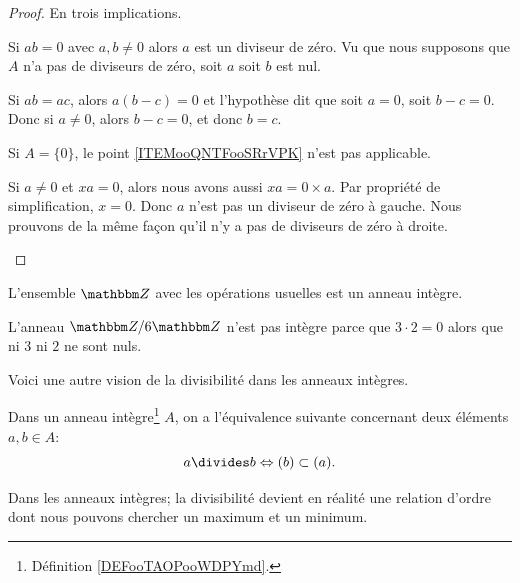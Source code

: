 \begin{proof}
    En trois implications.
    \begin{subproof}
        \item[\ref{ITEMooMXMKooXMYpkN} implique \ref{ITEMooLAJCooFwxXrV}]

            Si \( ab=0\) avec \( a,b\neq 0\) alors \( a\) est un diviseur de zéro. Vu que nous supposons que \( A\) n'a pas de diviseurs de zéro, soit \( a\) soit \( b\) est nul.
        \item[\ref{ITEMooLAJCooFwxXrV} implique \ref{ITEMooQNTFooSRrVPK}]

            Si \( ab=ac\), alors \( a(b-c)=0\) et l'hypothèse dit que soit \( a=0\), soit \( b-c=0\). Donc si \( a\neq 0\), alors \( b-c=0\), et donc \( b = c \).
        \item[\ref{ITEMooQNTFooSRrVPK} implique \ref{ITEMooMXMKooXMYpkN}]
            Si \( A=\{ 0 \}\), le point \ref{ITEMooQNTFooSRrVPK} n'est pas applicable.

            Si \( a\neq 0\) et \( xa=0\), alors nous avons aussi \( xa=0\times a\). Par propriété de simplification, \( x=0\). Donc \( a\) n'est pas un diviseur de zéro à gauche. Nous prouvons de la même façon qu'il n'y a pas de diviseurs de zéro à droite.
    \end{subproof}
\end{proof}

\begin{example}     \label{EXooLDXRooSxUAXs}
    L'ensemble \( \eZ\) avec les opérations usuelles est un anneau intègre.
\end{example}

\begin{example}
    L'anneau \( \eZ/6\eZ\) n'est pas intègre parce que \( 3\cdot 2=0\) alors que ni \( 3\) ni \( 2\) ne sont nuls.
\end{example}


Voici une autre vision de la divisibilité dans les anneaux intègres.
\begin{proposition}\label{PropDiviseurIdeaux}
    Dans un anneau intègre\footnote{Définition \ref{DEFooTAOPooWDPYmd}.} $A$, on a l'équivalence suivante concernant deux éléments \( a, b \in A \):
\begin{equation}
    a\divides b\Leftrightarrow (b)\subset (a).
\end{equation}
\end{proposition}

Dans les anneaux intègres; la divisibilité devient en réalité une relation d'ordre dont nous pouvons chercher un maximum et un minimum.


